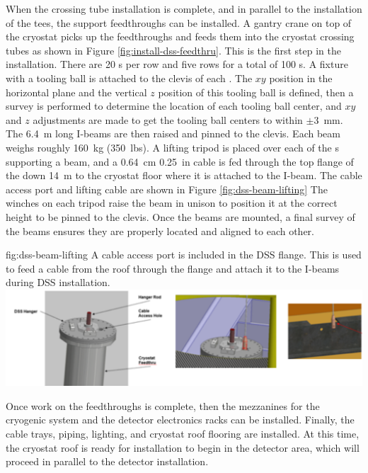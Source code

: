 When the crossing tube installation is complete, and in parallel to the installation of the  tees, the  support feedthroughs can be installed. A gantry crane on top of the cryostat picks up the feedthroughs and feeds them into the cryostat crossing tubes as shown in Figure \ref{fig:install-dss-feedthru}.
This is the first step in the  installation.
There are \num{20} \fdth{}s per row and five rows for a total of \num{100} \fdth{}s.  
A fixture with a tooling ball is attached to the
clevis of each \fdth.  
The $xy$ position in the horizontal plane
and the vertical $z$ position of this tooling ball is defined, then a  survey is performed to determine the location of each tooling ball center, and $xy$ and $z$ adjustments are made to get the tooling
ball centers to within $\pm$\SI{3}{mm}.  
The \SI{6.4}{m} long I-beams are then raised and pinned to the clevis.  Each beam weighs roughly \SI{160}{kg} (\SI{350}{lbs}).
A lifting tripod is placed over each of the \fdth{}s supporting a beam, and a \SI{0.64}{cm} \SI{0.25}{in}  %
cable is fed through the top
flange of the \fdth down \SI{14}{m} to the cryostat floor where it
is attached to the I-beam. The cable access port and lifting cable are shown in Figure \ref{fig:dss-beam-lifting} 
The winches on each tripod raise the beam in unison to position it at the correct height to be pinned to the \fdth clevis.  
Once the beams are mounted, a final survey of the beams ensures they are properly located and aligned to each other.

 \begin{dunefigure}{fig:dss-beam-lifting}
  {A cable access port is included in the DSS flange. This is used to feed a cable from the roof through the flange and attach it to the I-beams during DSS installation.}
 \includegraphics[width=.95\textwidth]{graphics/dss-beam-lifting.pdf}
\end{dunefigure}

Once work on the feedthroughs is complete, then the mezzanines for the cryogenic system and the detector electronics racks can be installed. Finally, the cable trays,  piping, lighting, and cryostat roof flooring are installed. 
At this time, the cryostat roof is ready for  installation to begin in the detector area, which will proceed in parallel to the detector installation.

